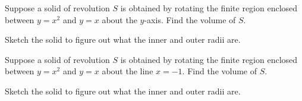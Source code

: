 \documentclass[../main.tex]{subfiles}
\begin{document}
  \begin{example}
    Suppose a solid of revolution \(S\) is obtained by rotating the finite region enclosed between \(y = x^{2}\) and \(y = x\) about the \(y\)-axis.  Find the volume of \(S\).


    Sketch the solid to figure out what the inner and outer radii are.

    \begin{center}
      
    \end{center}

  \end{example}
  \clearpage

  \begin{example}
    Suppose a solid of revolution \(S\) is obtained by rotating the finite region enclosed between \(y = x^{2}\) and \(y = x\) about the line \(x = -1\).  Find the volume of \(S\).

    Sketch the solid to figure out what the inner and outer radii are.

    \begin{center}
      
    \end{center}

  \end{example}
\end{document}
